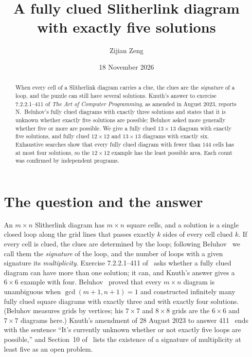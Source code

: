 \documentclass[11pt]{amsart}
\theoremstyle{remark}
\begin{document}
\title[Fully clued Slitherlink with five solutions]{A fully clued Slitherlink diagram with exactly five solutions}
\author{Zijian Zeng}
\address{UCSI University, Kuala Lumpur, Malaysia}
\date{18 November 2026}
\begin{abstract}
When every cell of a Slitherlink diagram carries a clue, the clues are the \emph{signature} of a loop, and the
puzzle can still have several solutions. Knuth's answer to exercise 7.2.2.1--411 of \emph{The Art of Computer
Programming}, as amended in August 2023, reports N.~Beluhov's fully clued diagrams with exactly three solutions and
states that it is unknown whether exactly five solutions are possible; Beluhov asked more generally whether five or
more are possible. We give a fully clued $13\times13$ diagram with exactly five solutions, and fully clued $12\times12$
and $13\times13$ diagrams with exactly six. Exhaustive searches show that every fully clued diagram with fewer than
$144$ cells has at most four solutions, so the $12\times12$ example has the least possible area. Each count was
confirmed by independent programs.
\end{abstract}
\maketitle

\section{The question and the answer}
An $m\times n$ Slitherlink diagram has $m\times n$ square cells, and a solution is a single closed loop along the
grid lines that passes exactly $k$ sides of every cell clued $k$. If every cell is clued, the clues are determined by
the loop; following Beluhov~\cite{beluhov} we call them the \emph{signature} of the loop, and the number of loops with
a given signature its \emph{multiplicity}. Exercise 7.2.2.1--411 of~\cite{knuth4b} asks whether a fully clued diagram
can have more than one solution; it can, and Knuth's answer gives a $6\times6$ example with four. Beluhov~\cite{beluhov}
proved that every $m\times n$ diagram is unambiguous when $\gcd(m+1,n+1)=1$ and constructed infinitely many fully
clued square diagrams with exactly three and with exactly four solutions. (Beluhov measures grids by vertices; his
$7\times7$ and $8\times8$ grids are the $6\times6$ and $7\times7$ diagrams here.) Knuth's amendment of 28 August 2023
to answer 411~\cite{errata4b} ends with the sentence ``It's currently unknown whether or not exactly five loops are
possible,'' and Section~10 of~\cite{beluhov} lists the existence of a signature of multiplicity at least five as an
open problem.
\end{document}
